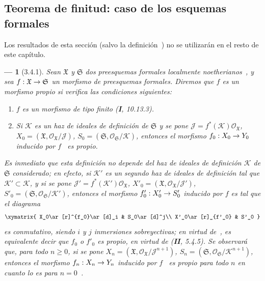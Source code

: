\documentclass[10pt,oneside,openany]{book}
\theoremstyle{egaenv}\newtheorem*{env}{---}
\theoremstyle{egastatement}
\theoremstyle{egadescription}
\newcommand{\oldpage}[2][]{\marginnote{\normalfont\scriptsize\textbf{#1}\,|\,#2}\ignorespaces}
\renewcommand{\geq}{\geqslant}
\renewcommand{\to}{\mathchoice{\longrightarrow}{\rightarrow}{\rightarrow}{\rightarrow}}
\begin{document}
\subsection{Teorema de finitud: caso de los esquemas formales}
\label{subsection:III.3.4}
\label{subsection:III.3.4-fr}

\oldpage[III]{119}
Los resultados de esta sección (salvo la definición~) no se utilizarán en el resto de este capítulo.

\begin{env}[3.4.1]
\label{III.3.4.1}
\label{III.3.4.1-fr}
Sean $\mathfrak X$ y $\mathfrak S$ dos preesquemas formales localmente noetherianos~, y sea $f:\mathfrak X\to\mathfrak S$ un morfismo de preesquemas formales.
Diremos que $f$ es un morfismo \emph{propio} si
verifica las condiciones siguientes:
\begin{enumerate}
\item[$1^\circ$] \emph{$f$ es un morfismo de tipo finito} (\textbf{I}, 10.13.3).
\item[$2^\circ$] \emph{Si $\mathcal K$ es un haz de ideales de definición de $\mathfrak S$ y se pone $\mathcal J=f^*(\mathcal K)\mathcal O_{\mathfrak X}$, $X_0=(\mathfrak X,\mathcal O_{\mathfrak X}/\mathcal J)$, $S_0=(\mathfrak S,\mathcal O_{\mathfrak S}/\mathcal K)$, entonces el morfismo $f_0:X_0\to Y_0$ inducido por $f$~ es propio}.
\end{enumerate}
Es inmediato que esta definición no depende del haz de ideales de definición $\mathcal K$ de $\mathfrak S$ considerado; en efecto, si $\mathcal K'$ es un segundo haz de ideales de definición tal que $\mathcal K'\subset\mathcal K$, y si se pone $\mathcal J'=f^*(\mathcal K')\mathcal O_{\mathfrak X}$, $X'_0=(\mathfrak X,\mathcal O_{\mathfrak X}/\mathcal J')$, $S'_0=(\mathfrak S,\mathcal O_{\mathfrak S}/\mathcal K')$, entonces el morfismo $f'_0:X'_0\to S'_0$ inducido por $f$ es tal que el diagrama
\[
\xymatrix{
X_0\ar[r]^{f_0}\ar[d]_i & S_0\ar[d]^j\\
X'_0\ar[r]_{f'_0} & S'_0
}
\]
es conmutativo, siendo $i$ y $j$ inmersiones sobreyectivas; en virtud de~, es equivalente decir que $f_0$ o $f'_0$ es propio, en virtud de (\textbf{II}, 5.4.5). Se observará que, para todo $n\geq0$, si se pone $X_n=(\mathfrak X,\mathcal O_{\mathfrak X}/\mathcal J^{n+1})$, $S_n=(\mathfrak S,\mathcal O_{\mathfrak S}/\mathcal K^{n+1})$, entonces el morfismo $f_n:X_n\to Y_n$ inducido por $f$~ es propio para todo $n$ en cuanto lo es para $n=0$~.


\end{env}
\end{document}
